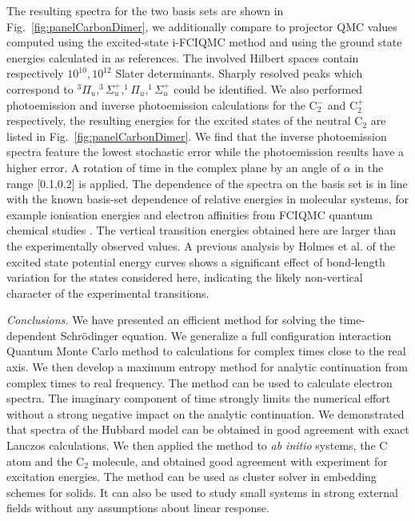 \documentclass[aps,prl,twocolumn,showpacs,superscriptaddress,floatfix]{revtex4-1}
\begin{document}
The resulting spectra for the two basis sets                 
are shown in Fig.~\ref{fig:panelCarbonDimer}, we additionally compare to
projector QMC values computed using the excited-state i-FCIQMC method \cite{excited_state_neci} and
using the ground state energies calculated in \cite{BTCA2012} as references. The involved Hilbert spaces contain respectively 
$10^{10}, 10^{12}$ Slater determinants. 
Sharply resolved peaks which correspond to $^3\Pi_u, ^3\Sigma^+_u, 
 ^1\Pi_u, ^1\Sigma^+_u$ could be identified. We also performed photoemission
 and inverse photoemission calculations for the C$_2^-$ and C$_2^+$
 respectively, the resulting energies for the excited states of the neutral
 C$_2$ are listed in Fig.~\ref{fig:panelCarbonDimer}. We find that the inverse
 photoemission spectra feature the lowest stochastic error while the
 photoemission results have a higher error. A rotation of time in the complex plane by an angle of $\alpha$ in the range [0.1,0.2] 
 is applied.
 The dependence of the spectra on the basis set is in line with the known basis-set dependence of 
 relative energies in molecular systems, for example ionisation energies and electron affinities
 from FCIQMC quantum chemical studies  \cite{BA2010,CBA2011,BCTA2011}. The vertical transition energies 
obtained here are larger than the experimentally observed values.  A previous analysis by Holmes et al. \cite{HUS2017} 
of the excited state  potential energy curves shows a significant effect of bond-length variation for the states considered here, 
indicating the likely non-vertical character of the experimental transitions. 

{\it Conclusions.} We have presented an efficient method for solving the time-dependent Schr\"odinger 
equation. We generalize a full configuration interaction Quantum Monte Carlo method to calculations 
for complex times close to the real axis. We then develop a maximum entropy method for analytic
continuation from complex times to real frequency. The method can be used to calculate 
electron spectra. The imaginary component of time strongly limits the numerical effort without 
a strong negative impact on the analytic continuation. We demonstrated that spectra of the Hubbard model 
can be obtained in good agreement with exact Lanczos calculations. We then applied the method to 
{\it ab initio} systems, the C atom and the C$_2$ molecule, and obtained good agreement 
with experiment for excitation energies. The method can be used as cluster solver in embedding 
schemes for solids. It  can also be used to study small systems in strong external 
fields without any assumptions about linear response.
 

%
\clearpage

\end{document}
